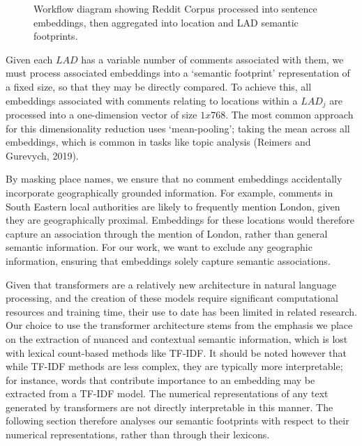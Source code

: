 \documentclass[
]{article}
\begin{document}
\begin{figure}


\caption{\label{fig-workflowfoot}Workflow diagram showing Reddit Corpus
processed into sentence embeddings, then aggregated into location and
LAD semantic footprints.}

\end{figure}%

Given each \(LAD\) has a variable number of comments associated with
them, we must process associated embeddings into a `semantic footprint'
representation of a fixed size, so that they may be directly compared.
To achieve this, all embeddings associated with comments relating to
locations within a \(LAD_j\) are processed into a one-dimension vector
of size \(1x768\). The most common approach for this dimensionality
reduction uses `mean-pooling'; taking the mean across all embeddings,
which is common in tasks like topic analysis (Reimers and Gurevych,
2019).

By masking place names, we ensure that no comment embeddings
accidentally incorporate geographically grounded information. For
example, comments in South Eastern local authorities are likely to
frequently mention London, given they are geographically proximal.
Embeddings for these locations would therefore capture an association
through the mention of London, rather than general semantic information.
For our work, we want to exclude any geographic information, ensuring
that embeddings solely capture semantic associations.

Given that transformers are a relatively new architecture in natural
language processing, and the creation of these models require
significant computational resources and training time, their use to date
has been limited in related research. Our choice to use the transformer
architecture stems from the emphasis we place on the extraction of
nuanced and contextual semantic information, which is lost with lexical
count-based methods like TF-IDF. It should be noted however that while
TF-IDF methods are less complex, they are typically more interpretable;
for instance, words that contribute importance to an embedding may be
extracted from a TF-IDF model. The numerical representations of any text
generated by transformers are not directly interpretable in this manner.
The following section therefore analyses our semantic footprints with
respect to their numerical representations, rather than through their
lexicons.
\end{document}
